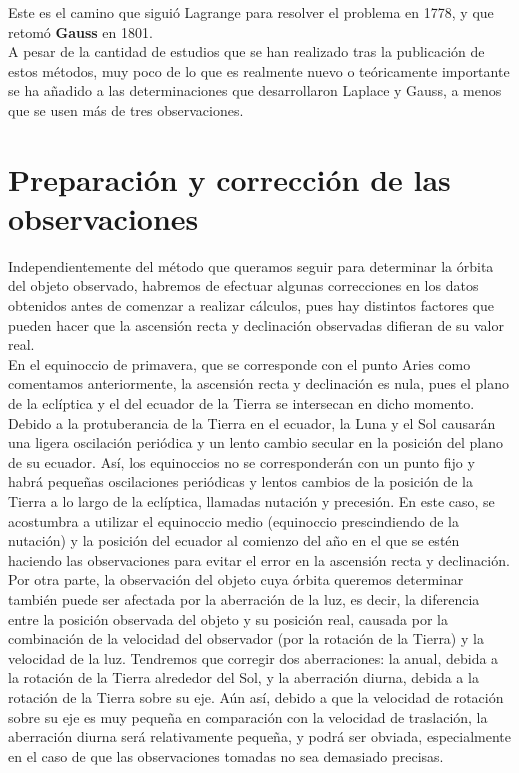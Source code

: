 Este es el camino que siguió Lagrange para resolver el problema en 1778, y que retomó \textbf{Gauss} en 1801.\\

A pesar de la cantidad de estudios que se han realizado tras la publicación de estos métodos, muy poco de lo que es realmente nuevo o teóricamente importante se ha añadido a las determinaciones que desarrollaron Laplace y Gauss, a menos que se usen más de tres observaciones.\\


\section{Preparación y corrección de las observaciones}
Independientemente del método que queramos seguir para determinar la órbita del objeto observado, habremos de efectuar algunas correcciones en los datos obtenidos antes de comenzar a realizar cálculos, pues hay distintos factores que pueden hacer que la ascensión recta y declinación observadas difieran de su valor real.\\

En el equinoccio de primavera, que se corresponde con el punto Aries como comentamos anteriormente, la ascensión recta y declinación es nula, pues el plano de la eclíptica y el del ecuador de la Tierra se intersecan en dicho momento. Debido a la protuberancia de la Tierra en el ecuador, la Luna y el Sol causarán una ligera oscilación periódica y un lento cambio secular en la posición del plano de su ecuador. Así, los equinoccios no se corresponderán con un punto fijo y habrá pequeñas oscilaciones periódicas y lentos cambios de la posición de la Tierra a lo largo de la eclíptica, llamadas nutación y precesión. En este caso, se acostumbra a utilizar el equinoccio medio (equinoccio prescindiendo de la nutación) y la posición del ecuador al comienzo del año en el que se estén haciendo las observaciones para evitar el error en la ascensión recta y declinación.\\

Por otra parte, la observación del objeto cuya órbita queremos determinar también puede ser afectada por la aberración de la luz, es decir, la diferencia entre la posición observada del objeto y su posición real, causada por la combinación de la velocidad del observador (por la rotación de la Tierra) y la velocidad de la luz. Tendremos que corregir dos aberraciones: la anual, debida a la rotación de la Tierra alrededor del Sol, y la aberración diurna, debida a la rotación de la Tierra sobre su eje. Aún así, debido a que la velocidad de rotación sobre su eje es muy pequeña en comparación con la velocidad de traslación, la aberración diurna será relativamente pequeña, y podrá ser obviada, especialmente en el caso de que las observaciones tomadas no sea demasiado precisas.\\


